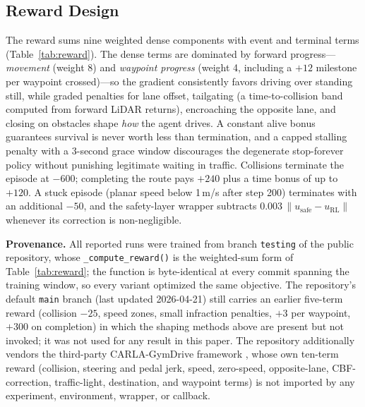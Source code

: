 \documentclass[conference]{IEEEtran}
\begin{document}
\subsection{Reward Design}
The reward sums nine weighted dense components with event and terminal terms (Table~\ref{tab:reward}). The dense terms are dominated by forward progress---\emph{movement} (weight 8) and \emph{waypoint progress} (weight 4, including a $+12$ milestone per waypoint crossed)---so the gradient consistently favors driving over standing still, while graded penalties for lane offset, tailgating (a time-to-collision band computed from forward LiDAR returns), encroaching the opposite lane, and closing on obstacles shape \emph{how} the agent drives. A constant alive bonus guarantees survival is never worth less than termination, and a capped stalling penalty with a 3-second grace window discourages the degenerate stop-forever policy without punishing legitimate waiting in traffic. Collisions terminate the episode at $-600$; completing the route pays $+240$ plus a time bonus of up to $+120$. A stuck episode (planar speed below 1\,m/s after step 200) terminates with an additional $-50$, and the safety-layer wrapper subtracts $0.003\,\lVert u_{\mathrm{safe}}-u_{\mathrm{RL}}\rVert$ whenever its correction is non-negligible.

\textbf{Provenance.} All reported runs were trained from branch \texttt{testing} of the public repository, whose \texttt{\_compute\_reward()} is the weighted-sum form of Table~\ref{tab:reward}; the function is byte-identical at every commit spanning the training window, so every variant optimized the same objective. The repository's default \texttt{main} branch (last updated 2026-04-21) still carries an earlier five-term reward (collision $-25$, speed zones, small infraction penalties, $+3$ per waypoint, $+300$ on completion) in which the shaping methods above are present but not invoked; it was not used for any result in this paper. The repository additionally vendors the third-party CARLA-GymDrive framework \cite{morgado2024gymdrive}, whose own ten-term reward (collision, steering and pedal jerk, speed, zero-speed, opposite-lane, CBF-correction, traffic-light, destination, and waypoint terms) is not imported by any experiment, environment, wrapper, or callback.
\end{document}
